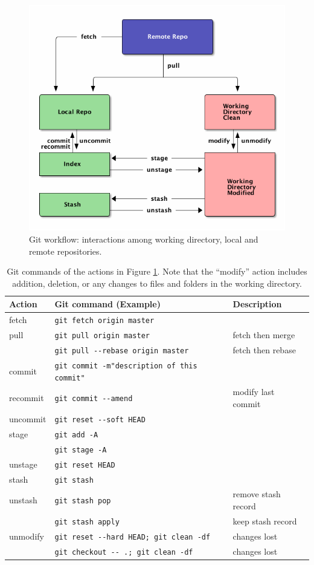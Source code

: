\documentclass[11pt]{article}
\begin{document}
\begin{figure}[htb]
\centering
\includegraphics[width=.9\linewidth]{./images/git-workflow.png}
\caption{\label{fig:orgparagraph5}
Git workflow: interactions among working directory, local and remote repositories.}
\end{figure}

\begin{table}[htb]
\caption{\label{tab:orgtable1}
Git commands of the actions in Figure \ref{fig:orgparagraph5}. Note that the ``modify'' action includes addition, deletion, or any changes to files and folders in the working directory.}
\centering
\begin{tabular}{lll}
Action & Git command (Example) & Description\\
\hline
fetch & \texttt{git fetch origin master} & \\
pull & \texttt{git pull origin master} & fetch then merge\\
 & \texttt{git pull -{}-rebase origin master} & fetch then rebase\\
commit & \texttt{git commit -m"description of this commit"} & \\
recommit & \texttt{git commit -{}-amend} & modify last commit\\
uncommit & \texttt{git reset -{}-soft HEAD} & \\
stage & \texttt{git add -A} & \\
 & \texttt{git stage -A} & \\
unstage & \texttt{git reset HEAD} & \\
stash & \texttt{git stash} & \\
unstash & \texttt{git stash pop} & remove stash record\\
 & \texttt{git stash apply} & keep stash record\\
unmodify & \texttt{git reset -{}-hard HEAD; git clean -df} & changes lost\\
 & \texttt{git checkout -{}- .; git clean -df} & changes lost\\
\end{tabular}
\end{table}
\end{document}
